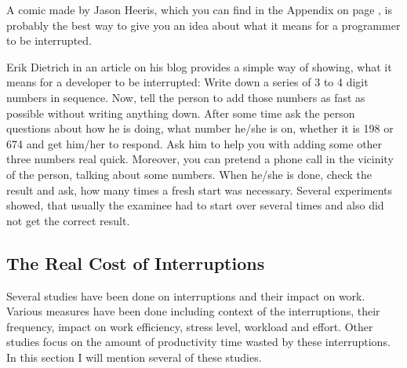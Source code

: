 \documentclass[11pt,singleside]{myfithesis2}
\begin{document}
A comic made by Jason Heeris, which you can find in the Appendix on page \pageref{app:programmer},  is probably the best way to give you an idea about what it means for a programmer to be interrupted.

Erik Dietrich in an article on his blog \cite{costOfInterruptions} provides a simple way of showing, what it means for a developer to be interrupted:\newline
Write down a series of 3 to 4 digit numbers in sequence. Now, tell the person to add those numbers as fast as possible without writing anything down. After some time ask the person questions about how he is doing, what number he/she is on, whether it is 198 or 674 and get him/her to respond. Ask him to help you with adding some other three numbers real quick. Moreover, you can pretend a phone call in the vicinity of the person, talking about some numbers. When he/she is done, check the result and ask, how many times a fresh start was necessary. Several experiments showed, that usually the examinee had to start over several times and also did not get the correct result.

		\subsection{The Real Cost of Interruptions }
Several studies have been done on interruptions and their impact on work. Various measures have been done including context of the interruptions, their frequency, impact on work efficiency, stress level, workload and effort. Other studies focus on the amount of productivity time wasted by these interruptions. In this section I will mention several of these studies.
\end{document}
